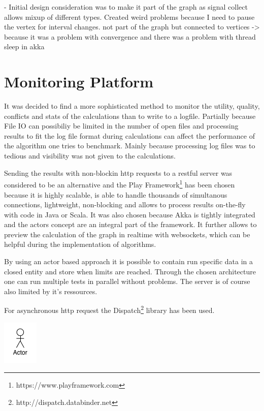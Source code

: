 - Initial design consideration was to make it part of the graph as signal collect allows mixup of different types. Created weird problems because I need to pause the vertex for interval changes. not part of the graph but connected to vertices -> because it was a problem with convergence and there was a problem with thread sleep in akka

\section{Monitoring Platform}

It was decided to find a more sophisticated method to monitor the utility, quality, conflicts and stats of the calculations than to write to a logfile. Partially because File IO can possibiliy be limited in the number of open files and processing results to fit the log file format during calculations can affect the performance of the algorithm one tries to benchmark. Mainly because processing log files was to tedious and visibility was not given to the calculations.

Sending the results with non-blockin http requests to a restful server was considered to be an alternative and the Play Framework\footnote{https://www.playframework.com} has been chosen because it is highly scalable, is able to handle thousands of simultanous connections, lightweight, non-blocking and allows to process results on-the-fly with code in Java or Scala. It was also chosen because Akka is tightly integrated and the actors concept are an integral part of the framework. It further allows to preview the calculation of the graph in realtime with websockets, which can be helpful during the implementation of algorithms.

By using an actor based approach it is possible to contain run specific data in a closed entity and store when limits are reached. Through the chosen architecture one can run multiple tests in parallel without problems. The server is of course also limited by it's ressources.

For asynchronous http request the Dispatch\footnote{http://dispatch.databinder.net} library has been used.

\includegraphics{graphics/monitoring}


